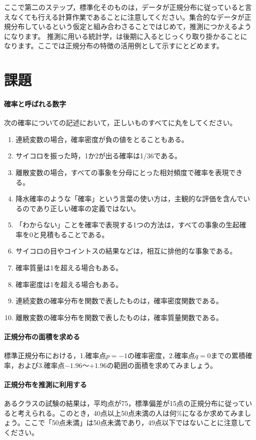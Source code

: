 \documentclass{ltjbook}
\begin{document}
ここで第二のステップ，標準化そのものは，データが正規分布に従っていると言えなくても行える計算作業であることに注意してください。集合的なデータが正規分布しているという仮定と組み合わさることではじめて，推測につかえるようになります。
推測に用いる統計学，は後期に入るとじっくり取り掛かることになります。ここでは正規分布の特徴の活用例として示すにとどめます。




\section{課題}
\paragraph{確率と呼ばれる数字}次の確率についての記述において，正しいものすべてに丸をしてください。

\begin{enumerate}
	\item 連続変数の場合，確率密度が負の値をとることもある。
	\item サイコロを振った時，1か2が出る確率は1/36である。
	\item 離散変数の場合，すべての事象を分母にとった相対頻度で確率を表現できる。
	\item 降水確率のような「確率」という言葉の使い方は，主観的な評価を含んでいるのであり正しい確率の定義ではない。
	\item 「わからない」ことを確率で表現する1つの方法は，すべての事象の生起確率を0と見積もることである。
	\item サイコロの目やコイントスの結果などは，相互に排他的な事象である。
	\item 確率質量は1を超える場合もある。
	\item 確率密度は1を超える場合もある。
	\item 連続変数の確率分布を関数で表したものは，確率密度関数である。
	\item 離散変数の確率分布を関数で表したものは，確率質量関数である。
\end{enumerate}

\paragraph{正規分布の面積を求める}標準正規分布における，1.確率点$p=-1$の確率密度，2.確率点$q=0$までの累積確率，および3.確率点$-1.96$〜$+1.96$の範囲の面積を求めてみましょう。
\paragraph{正規分布を推測に利用する}あるクラスの試験の結果は，平均点が75，標準偏差が15点の正規分布に従っていると考えられる。このとき，40点以上50点未満の人は何\%になるか求めてみましょう。ここで「50点未満」は50点未満であり，49点以下ではないことに注意してください。
\end{document}
